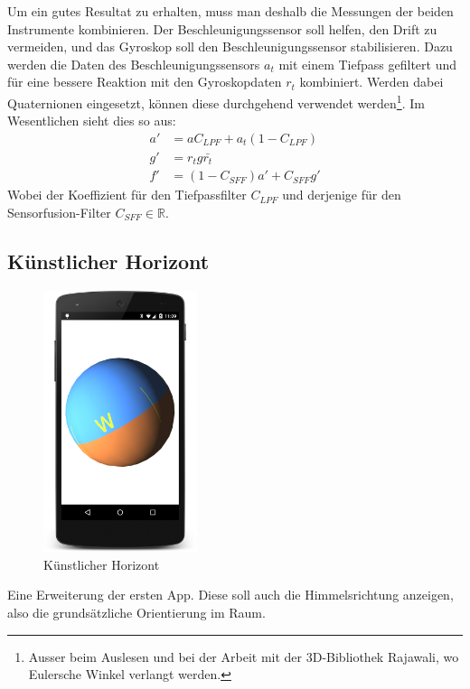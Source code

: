 \documentclass[12pt]{article}
\begin{document}
  Um ein gutes Resultat zu erhalten, muss man deshalb die Messungen der beiden Instrumente kombinieren. Der Beschleunigungssensor soll helfen, den Drift zu vermeiden, und das Gyroskop soll den Beschleunigungssensor stabilisieren. Dazu werden die Daten des Beschleunigungssensors $a_t$ mit einem Tiefpass gefiltert und für eine bessere Reaktion mit den Gyroskopdaten $r_t$ kombiniert. Werden dabei Quaternionen eingesetzt, können diese durchgehend verwendet werden\footnote{Ausser beim Auslesen und bei der Arbeit mit der 3D-Bibliothek Rajawali, wo Eulersche Winkel verlangt werden.}. Im Wesentlichen sieht dies so aus:
  \begin{align*}
    a' &= a C_{LPF} +  a_t (1 - C_{LPF}) \\
    g' &= r_t g \bar{r_t}    \\
    f' &= (1 - C_{SFF}) a' + C_{SFF} g'
  \end{align*}
  Wobei der Koeffizient für den Tiefpassfilter $C_{LPF}$ und derjenige für den Sensorfusion-Filter $C_{SFF} \in \mathbb{R}$.


  \subsection{Künstlicher Horizont}

\begin{figure}
    \vspace{-12pt}
    \centering
    \includegraphics[width=0.4\textwidth]{artificial-horizon.png}
    \vspace{-18pt}
    \caption{Künstlicher Horizont}
    \label{fig:screenshot_artificial_horizon}
    \vspace{-10pt}
\end{figure}
  Eine Erweiterung der ersten App. Diese soll auch die Himmelsrichtung anzeigen, also die grundsätzliche Orientierung im Raum.
\end{document}
